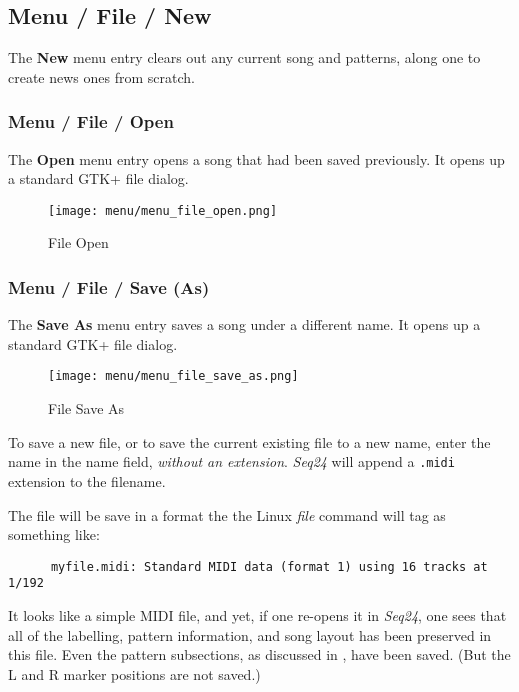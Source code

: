 \subsection{Menu / File / New}
\label{subsec:menu_file_new}

   The \textbf{New} menu entry clears out any current song and patterns,
   along one to create news ones from scratch.

\subsubsection{Menu / File / Open}
\label{subsubsec:seq24_menu_file_open}

   The \textbf{Open} menu entry opens a song that had been saved previously.
   It opens up a standard GTK+ file dialog.

\begin{figure}[H]
   \centering 
   \texttt{[image: menu/menu\_file\_open.png]}
   \caption{File Open}
   \label{fig:seq24_menu_file_open}
\end{figure}

\subsubsection{Menu / File / Save (As)}
\label{subsubsec:menu_file_open_save_as}

   The \textbf{Save As} menu entry saves a song under a different name.
   It opens up a standard GTK+ file dialog.

\begin{figure}[H]
   \centering 
   \texttt{[image: menu/menu\_file\_save\_as.png]}
   \caption{File Save As}
   \label{fig:seq24_menu_file_save_as}
\end{figure}

   To save a new file, or to save the current existing file to a new name,
   enter the name in the name field, \textsl{without an extension}.
   \textsl{Seq24} will append a \texttt{.midi} extension to the filename.

   The file will be save in a format the the Linux \textsl{file} command
   will tag as something like:

   \begin{verbatim}
      myfile.midi: Standard MIDI data (format 1) using 16 tracks at 1/192
   \end{verbatim}

   It looks like a simple MIDI file, and yet, if one re-opens it in
   \textsl{Seq24}, one sees that all of the labelling, pattern information,
   and song layout has been preserved in this file.
   Even the pattern subsections, as discussed in
   ,
   have been saved.
   (But the L and R marker positions are not saved.)

